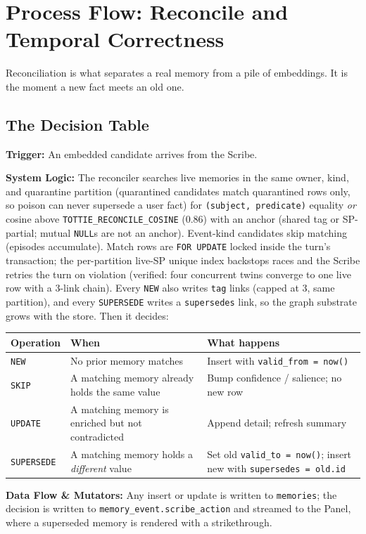 \chapter{Process Flow: Reconcile and Temporal Correctness}
Reconciliation is what separates a real memory from a pile of embeddings. It is the moment a new
fact meets an old one.

\section{The Decision Table}
\textbf{Trigger:} An embedded candidate arrives from the Scribe.

\textbf{System Logic:} The reconciler searches live memories in the same owner, kind, and
quarantine partition (quarantined candidates match quarantined rows only, so poison can never
supersede a user fact) for \texttt{(subject, predicate)} equality \emph{or} cosine above
\texttt{TOTTIE\_RECONCILE\_COSINE} (0.86) with an anchor (shared tag or SP-partial; mutual
\texttt{NULL}s are not an anchor). Event-kind candidates skip matching (episodes accumulate).
Match rows are \texttt{FOR UPDATE} locked inside the turn's transaction; the per-partition live-SP
unique index backstops races and the Scribe retries the turn on violation (verified: four
concurrent twins converge to one live row with a 3-link chain). Every \texttt{NEW} also writes
\texttt{tag} links (capped at 3, same partition), and every \texttt{SUPERSEDE} writes a
\texttt{supersedes} link, so the graph substrate grows with the store. Then it decides:

\begin{longtable}{@{}p{}p{}p{}@{}}
\toprule
Operation & When & What happens \\
\midrule
\texttt{NEW} & No prior memory matches & Insert with \texttt{valid\_from = now()} \\
\texttt{SKIP} & A matching memory already holds the same value & Bump confidence / salience; no new row \\
\texttt{UPDATE} & A matching memory is enriched but not contradicted & Append detail; refresh summary \\
\texttt{SUPERSEDE} & A matching memory holds a \emph{different} value & Set old \texttt{valid\_to = now()}; insert new with \texttt{supersedes = old.id} \\
\bottomrule
\end{longtable}

\textbf{Data Flow \& Mutators:} Any insert or update is written to \texttt{memories}; the decision is
written to \texttt{memory\_event.scribe\_action} and streamed to the Panel, where a superseded memory
is rendered with a strikethrough.

